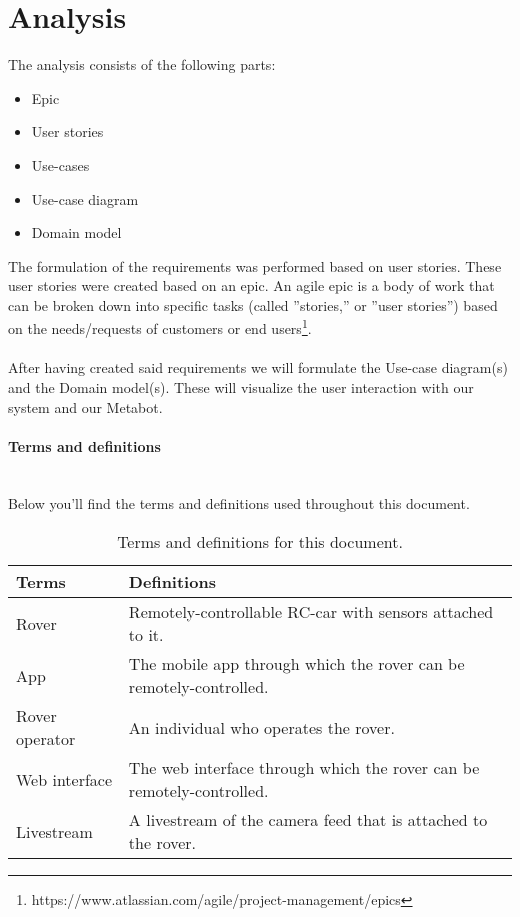 \documentclass[12pt]{article}
\begin{document}
	\section{Analysis}
	The analysis consists of the following parts:
	\begin{itemize}
		\item Epic
		\item User stories
		\item Use-cases
		\item Use-case diagram
		\item Domain model\\
	\end{itemize}	
	The formulation of the requirements was performed based on user stories. These user stories were created based on an epic. An agile epic is a body of work that can be broken down into specific tasks (called ''stories,'' or ''user stories'') based on the needs/requests of customers or end users\footnote{https://www.atlassian.com/agile/project-management/epics}.\\
	\\After having created said requirements we will formulate the Use-case diagram(s) and the Domain model(s). These will visualize the user interaction with our system and our Metabot.
	\paragraph{Terms and definitions}\mbox{}\\
	Below you'll find the terms and definitions used throughout this document.
	\FloatBarrier
	\begin{table}[h]
		\centering
		\begin{tabularx}{\linewidth}{|X|X|}
			\hline
			\textbf{Terms} &\textbf{Definitions}\\
			\hline
			Rover &Remotely-controllable RC-car with sensors attached to it.\\
			\hline
			App &The mobile app through which the rover can be remotely-controlled.\\
			\hline
			Rover operator &An individual who operates the rover.\\
			\hline
			Web interface &The web interface through which the rover can be remotely-controlled. \\
			\hline 
			Livestream &A livestream of the camera feed that is attached to the rover.\\
			\hline
		\end{tabularx}
		\caption{Terms and definitions for this document.}
		\label{table:termsDefinition}   
	\end{table}
	\FloatBarrier
	\newpage
\end{document}
